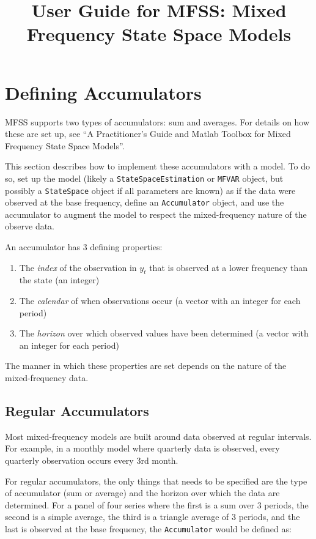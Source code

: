 \documentclass{article}
\title{User Guide for MFSS: Mixed Frequency State Space Models}
\begin{document}
\maketitle
\tableofcontents

\section{Defining Accumulators}

MFSS supports two types of accumulators: sum and averages. For details on how these are set up, see ``A Practitioner's Guide and Matlab Toolbox for Mixed Frequency State Space Models''. 

This section describes how to implement these accumulators with a model. To do so, set up the model (likely a \texttt{StateSpaceEstimation} or \texttt{MFVAR} object, but possibly a \texttt{StateSpace} object if all parameters are known) as if the data were observed at the base frequency, define an \texttt{Accumulator} object, and use the accumulator to augment the model to respect the mixed-frequency nature of the observe data.

An accumulator has 3 defining properties: 
\begin{enumerate}
  \item The \emph{index} of the observation in $y_t$ that is observed at a lower frequency than the state (an integer)
  \item The \emph{calendar} of when observations occur (a vector with an integer for each period)
  \item The \emph{horizon} over which observed values have been determined (a vector with an integer for each period)
\end{enumerate}

The manner in which these properties are set depends on the nature of the mixed-frequency data. 

\subsection{Regular Accumulators}
Most mixed-frequency models are built around data observed at regular intervals. For example, in a monthly model where quarterly data is observed, every quarterly observation occurs every 3rd month. 

For regular accumulators, the only things that needs to be specified are the type of accumulator (sum or average) and the horizon over which the data are determined. For a panel of four series where the first is a sum over 3 periods, the second is a simple average, the third is a triangle average of 3 periods, and the last is observed at the base frequency, the \texttt{Accumulator} would be defined as: 
\end{document}
